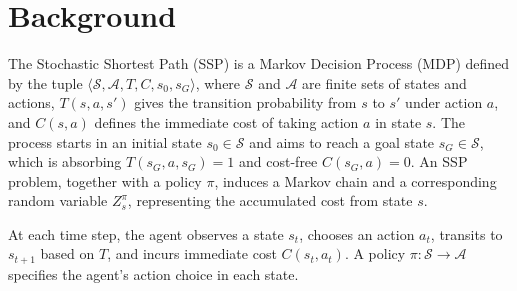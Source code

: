 \documentclass[runningheads]{llncs}
\begin{document}

\section{Background} \label{sec:background}

The Stochastic Shortest Path (SSP) is a Markov Decision Process (MDP) defined by the tuple $\langle \mathcal{S}, \mathcal{A}, T, C, s_0, s_G \rangle$, where $\mathcal{S}$ and $\mathcal{A}$ are finite sets of states and actions, $T(s,a,s')$ gives the transition probability from $s$ to $s'$ under action $a$, and $C(s,a)$ defines the immediate cost of taking action $a$ in state $s$. The process starts in an initial state $s_0 \in \mathcal{S}$ and aims to reach a goal state $s_G \in \mathcal{S}$, which is absorbing $T(s_G,a,s_G) = 1$ and cost-free $C(s_G,a) = 0$. An SSP problem, together with a policy $\pi$, induces a Markov chain and a corresponding random variable $Z^\pi_s$, representing the accumulated cost from state $s$.

At each time step, the agent observes a state $s_t$, chooses an action $a_t$, transits to $s_{t+1}$ based on $T$, and incurs immediate cost $C(s_t, a_t)$. A policy $\pi: \mathcal{S} \rightarrow \mathcal{A}$ specifies the agent's action choice in each state.
\end{document}
